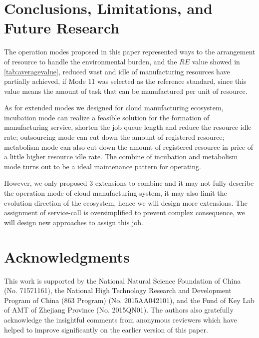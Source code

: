 \section{Conclusions, Limitations, and Future Research} %
\label{sec:contributions_limitations_and_future_research}
The operation modes proposed in this paper represented ways to the arrangement of resource to handle the environmental burden, and the $RE$ value showed in \autoref{tab:averagevalue}, reduced wast and idle of manufacturing resources have partially achieved, if Mode 11 was selected as the reference standard, since this value means the amount of task that can be manufactured per unit of resource.   

As for extended modes we designed for cloud manufacturing ecosystem, incubation mode can realize a feasible solution for the formation of manufacturing service, shorten the job queue length and reduce the resource idle rate; outsourcing mode can cut down the amount of registered resource; metabolism mode can also cut down the amount of registered resource in price of a little higher resource idle rate. The combine of incubation and metabolism mode turns out to be a ideal maintenance pattern for operating.

However, we only proposed 3 extensions to combine and it may not fully describe the operation mode of cloud manufacturing system, it may also limit the evolution direction of the ecosystem, hence we will design more extensions. The assignment of service-call is oversimplified to prevent complex consequence, we will design new approaches to assign this job.

\section{Acknowledgments} %
\label{sec:acknowledgments}
This work is supported by the National Natural Science Foundation of China (No. 71571161), the National High Technology Research and Development Program of China (863 Program) (No. 2015AA042101), and the Fund of Key Lab of AMT of Zhejiang Province (No. 2015QN01). The authors also gratefully acknowledge the insightful comments from anonymous reviewers which have helped to
improve significantly on the earlier version of this paper.
